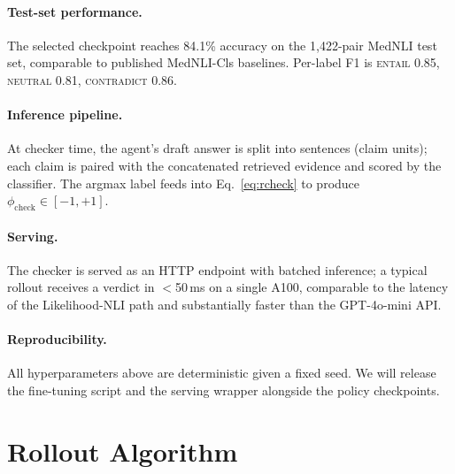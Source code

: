 \documentclass[11pt]{article}
\begin{document}
\paragraph{Test-set performance.}
The selected checkpoint reaches 84.1\% accuracy on the
1{,}422-pair MedNLI test set, comparable to published
MedNLI-Cls baselines. Per-label F1 is
\textsc{entail} 0.85, \textsc{neutral} 0.81,
\textsc{contradict} 0.86.

\paragraph{Inference pipeline.}
At checker time, the agent's draft answer is split into
sentences (claim units); each claim is paired with the
concatenated retrieved evidence and scored by the
classifier. The argmax label feeds into Eq.~\ref{eq:rcheck}
to produce $\phi_{\text{check}}\in[-1,+1]$.

\paragraph{Serving.}
The checker is served as an HTTP endpoint with batched
inference; a typical rollout receives a verdict in
$<$50\,ms on a single A100, comparable to the latency
of the Likelihood-NLI path and substantially faster
than the GPT-4o-mini API.

\paragraph{Reproducibility.}
All hyperparameters above are deterministic given a fixed
seed. We will release the fine-tuning script and the
serving wrapper alongside the policy checkpoints.
\FloatBarrier
\section{Rollout Algorithm}
\label{app:algorithm}
\end{document}
